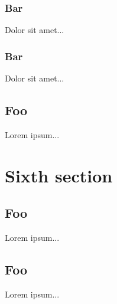 \documentclass{article}
\begin{document}
   \subsubsection{Bar}
   Dolor sit amet...
   \subsubsection{Bar}
   Dolor sit amet...
   \subsection{Foo}
   Lorem ipsum...
   \section{Sixth section}
   \subsection{Foo}
   Lorem ipsum...
   \subsection{Foo}
   Lorem ipsum...
\end{document}
